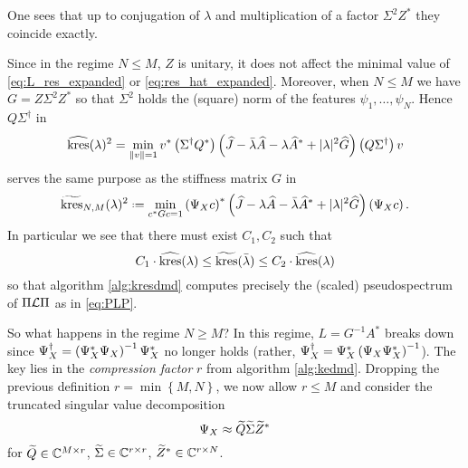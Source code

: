 One sees that up to conjugation of 
$\lambda$ and multiplication of a factor $\Sigma^2 Z^*$ they coincide exactly. 

Since in the regime $N \leq M$, $Z$ is unitary, it does not affect the minimal value 
of \ref{eq:L_res_expanded} or \ref{eq:res_hat_expanded}. Moreover, when $N \leq M$ we 
have $G = Z \Sigma^2 Z^*$ so that $\Sigma^2$ holds the (square) norm of the features 
$\psi_1, \ldots, \psi_N$. Hence $Q \Sigma^\dagger$ in 
\begin{equation}
    \widehat{ \text{kres} } (\lambda)^2 = 
    \min_{\| v \| = 1}
    v^* \left( \Sigma^\dagger Q^* \right) 
    \left( 
        \widehat{ J }
        - \bar{\lambda} \widehat{ A } 
        - \lambda \widehat{ A }^* 
        + | \lambda |^2 \widehat{ G }
    \right)
    \left( Q \Sigma^\dagger \right) v
\end{equation}
serves the same purpose as the stiffness matrix $G$ in 
\begin{equation}
    \label{eq:kres_tilde}
    \widetilde{ \kres }_{N,M} (\lambda)^2 \defeq 
    \min_{c^* G c = 1}
    \left( \YX c \right)^*
    \left( 
        \widehat{ J }
        - \lambda \widehat{ A } 
        - \bar{\lambda} \widehat{ A }^* 
        + | \lambda |^2 \widehat{ G }
    \right)
    \left( \YX c \right) . 
\end{equation}
In particular we see that there must exist $C_1, C_2$ such that 
\begin{equation}
    C_1 \cdot \widehat{ \text{kres} } (\lambda) \leq 
    \widetilde{ \text{kres} } (\bar{\lambda}) \leq
    C_2 \cdot \widehat{ \text{kres} } (\lambda)
\end{equation}
so that algorithm \ref{alg:kresdmd} computes precisely the (scaled) pseudospectrum of 
$\Pi \mathcal{L} \Pi$ as in \ref{eq:PLP}. 

So what happens in the regime $N \geq M$? In this regime, $L = G^{-1} A^*$ 
breaks down since $\Psi_X^\dagger = \left( \Psi_X^* \Psi_X \right)^{-1} \Psi_X^*$ no longer holds 
(rather, $\Psi_X^\dagger = \Psi_X^* \left( \Psi_X \Psi_X^* \right)^{-1}$). The key lies in the 
\emph{compression factor} $r$ from algorithm \ref{alg:kedmd}. Dropping the previous 
definition $r = \min\left\{ M, N \right\}$, we now allow $r \leq M$ and consider the 
truncated singular value decomposition 
\begin{equation}
    \Psi_X \approx \widetilde{ Q } \widetilde{ \Sigma } \widetilde{ Z }^*
\end{equation}
for $\widetilde{ Q } \in \mathbb{C}^{M \times r}$, $\widetilde{ \Sigma } \in \mathbb{C}^{r \times r}$, 
$\widetilde{ Z }^* \in \mathbb{C}^{r \times N}$. 

